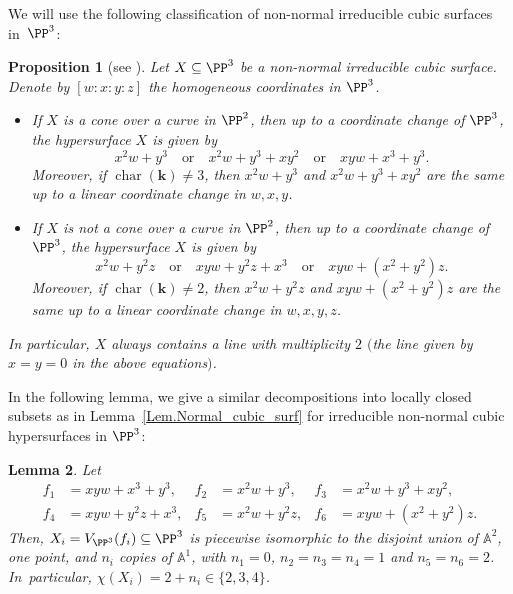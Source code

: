 \documentclass[JEP,XML,SOM,Unicode,NoFloatCountersInSection,published]{cedram}
\newtheorem{lemma}{Lemma}[section]
\newtheorem{proposition}[lemma]{Proposition}
\theoremstyle{definition}
\newcommand\A{{\mathbb A}}\let\AA\A
\newcommand{\kk}{\mathbf{k}}
\DeclareMathOperator{\car}{char}
\begin{document}
We will use the following classification of non-normal irreducible cubic surfaces in~$\PP^3$:

\begin{proposition}[{see \cite[Th.\,3.1]{LePaSc2011On-the-classificat}}]
\label{Prop.Classification_of_non-normal_cubic_surfaces}
Let $X \subseteq \PP^3$ be a non-normal irreducible cubic surface. Denote by $[w:x:y:z]$
the homogeneous coordinates in $\PP^3$.

\begin{itemize}
\item If $X$ is a cone over a curve in $\PP^2$,
then up to a coordinate change of $\PP^3$, the hypersurface $X$ is given by
\[
\label{Prop.Classification_of_non-normal_cubic_surfaces1}
\tag{$\ast$}
x^2 w + y^3 \quad \textrm{or} \quad
x^2 w + y^3 + xy^2 \quad \textrm{or} \quad xyw + x^3 + y^3.
\]
Moreover, if $\car(\kk) \neq 3$, then $x^2 w + y^3$ and $x^2 w + y^3 + xy^2$
are the same up to a linear coordinate change in $w, x, y$.

\item If $X$ is not a cone over a curve in $\PP^2$, then up to a coordinate change of $\PP^3$, the hypersurface $X$ is given by
\[
\label{Prop.Classification_of_non-normal_cubic_surfaces2}
\tag{$\ast\ast$}
x^2w+y^2z \quad \textrm{or} \quad
xyw +y^2z + x^3 \quad \textrm{or} \quad
xyw + (x^2+y^2)z.
\]
Moreover, if $\car(\kk) \neq 2$, then $x^2w+y^2z$ and $xyw + (x^2+y^2)z$ are the same up to a linear coordinate
change in $w, x, y, z$.
\end{itemize}

In particular, $X$ always contains a line with multiplicity $2$ $($the line given by $x=y=0$ in the above equations$)$.
\end{proposition}

In the following lemma, we give a similar decompositions into locally closed subsets as in Lemma~\ref{Lem.Normal_cubic_surf}
for irreducible non-normal cubic hypersurfaces in $\PP^3$:

\begin{lemma}
\label{Lem.Non-Normal_cubic_surf}
Let
\[
\begin{aligned}
f_1 &= xyw + x^3 + y^3, &
f_2 &= x^2 w + y^3, &
f_3 &= x^2 w + y^3 + xy^2, \\
f_4 &= xyw +y^2z + x^3, &
f_5 &= x^2w+y^2z, &
f_6 &= xyw + (x^2+y^2)z.
\end{aligned}
\]
Then, $X_i=V_{\PP^3}(f_i)\subseteq \PP^3$ is piecewise isomorphic to the disjoint union of $\A^2$, one point, and $n_i$ copies of $\A^1$, with $n_1=0$, $n_2=n_3=n_4=1$ and $n_5=n_6=2$. In~particular, $\chi(X_i)=2+n_i\in \{2,3,4\}$.
\end{lemma}
\end{document}
